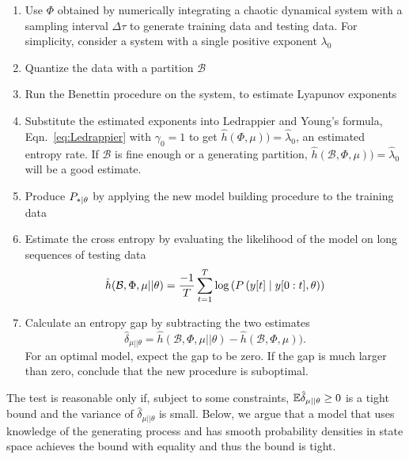 \begin{enumerate}
\item \label{PPB1} Use $\Phi$ obtained by numerically integrating a
  chaotic dynamical system with a sampling interval $\Delta\tau$ to
  generate training data and testing data.  For simplicity, consider a
  system with a single positive exponent $\lambda_0$
\item \label{PPB2} Quantize the data with a partition $\mathcal{B}$
\item \label{PPB3} Run the Benettin procedure on the system, to
  estimate Lyapunov exponents
\item \label{PPB4} Substitute the estimated exponents into Ledrappier
  and Young's formula, Eqn.~\eqref{eq:Ledrappier} with $\gamma_0 = 1$
  to get $\hat h(\Phi,\mu)) = \hat \lambda_0$, an estimated entropy rate.
  If $\mathcal{B}$ is fine enough or a generating partition,
  $\hat h(\mathcal{B},\Phi,\mu)) = \hat \lambda_0$ will be a good
  estimate.
\item \label{PPB5} Produce $P_{*\mid \theta}$ by applying the new model building
  procedure to the training data
\item \label{PPB6} Estimate the cross entropy by evaluating the
  likelihood of the model on long sequences of testing data
  \begin{equation}
    \label{eq:ToyCE}
    \hat h(\mathcal{B},\Phi,\mu||\theta) = \frac{-1}{T} \sum_{t=1}^T \log \left(
    P \left({y}{[t]}\mid y[0:t],\theta \right)\right)
  \end{equation}
\item \label{PPB7} Calculate an entropy gap  by
  subtracting the two estimates
  \begin{equation*}
    \hat \delta_{\mu||\theta} = \hat h(\mathcal{B},\Phi,\mu||\theta)
    -\hat h(\mathcal{B},\Phi,\mu)).
  \end{equation*}
  For an optimal model, expect the gap to be zero.  If the gap is much
  larger than zero, conclude that the new procedure is suboptimal.
\end{enumerate}
The test is reasonable only if, subject to some constraints, $\mathbb{E} \hat
\delta_{\mu||\theta} \geq 0$ is a tight bound and the variance of
$\hat \delta_{\mu||\theta}$ is small.  Below, we argue that a model
that uses knowledge of the generating process and has smooth
probability densities in state space achieves the bound with equality
and thus the bound is tight.

